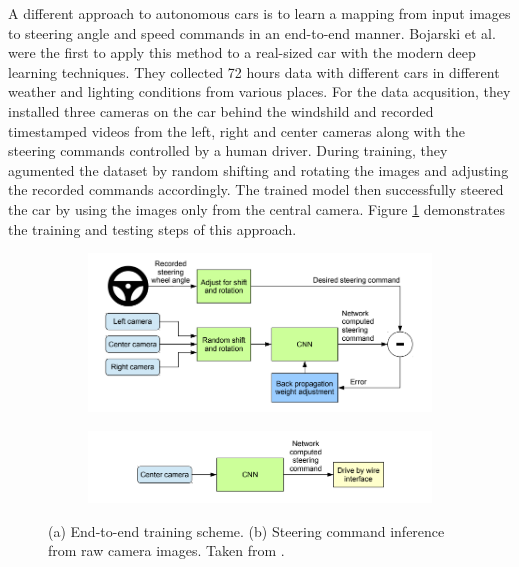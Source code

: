 A different approach to autonomous cars is to learn a mapping from input images
to steering angle and speed commands in an end-to-end manner. Bojarski et al.
\cite{Bojarski2016EndTE} were the first to apply this method to a real-sized
car with the modern deep learning techniques. They collected 72 hours data
with different cars in different weather and lighting conditions from various
places. For the data acqusition, they installed three cameras on the car behind
the windshild and recorded timestamped videos from the left, right and center
cameras along with the steering commands controlled by a human driver. During
training, they agumented the dataset by random shifting and rotating the images
and adjusting the recorded commands accordingly. The trained model then
successfully steered the car by using the images only from the central camera.
Figure \ref{figure:end-to-end-network} demonstrates the training and testing
steps of this approach.

\begin{figure}[h]
  \centering
  \begin{subfigure}[b]{1.0\linewidth}
    \includegraphics[width=\linewidth]{figures/end-to-end-training.png}
    \caption{}
  \end{subfigure}
  \begin{subfigure}[b]{1.0\linewidth}
    \includegraphics[width=\linewidth]{figures/end-to-end-inference.png}
    \caption{}
  \end{subfigure}
  \caption{(a) End-to-end training scheme. (b) Steering command inference from
    raw camera images. Taken from \cite{Bojarski2016EndTE}.}
    \label{figure:end-to-end-network}
\end{figure}

